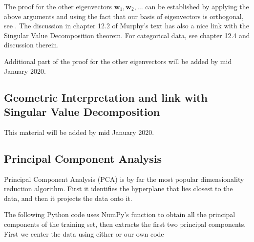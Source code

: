 \documentclass[letterpaper,10pt,english]{sphinxmanual}
\begin{document}
The proof
for the other eigenvectors \(\boldsymbol{w}_1,\boldsymbol{w}_2,\dots\) can be
established by applying the above arguments and using the fact that
our basis of eigenvectors is orthogonal, see .  The
discussion in chapter 12.2 of Murphy’s text has also a nice link with
the Singular Value Decomposition theorem. For categorical data, see
chapter 12.4 and discussion therein.

Additional part of the proof for the other eigenvectors will be added by mid January 2020.


\subsection{Geometric Interpretation and link with Singular Value Decomposition}
\label{\detokenize{chapter8:geometric-interpretation-and-link-with-singular-value-decomposition}}
This material will be added by mid January 2020.


\subsection{Principal Component Analysis}
\label{\detokenize{chapter8:principal-component-analysis}}
Principal Component Analysis (PCA) is by far the most popular dimensionality reduction algorithm.
First it identifies the hyperplane that lies closest to the data, and then it projects the data onto it.

The following Python code uses NumPy’s  function to obtain all the principal components of the
training set, then extracts the first two principal components. First we center the data using either  or our own code
\end{document}

